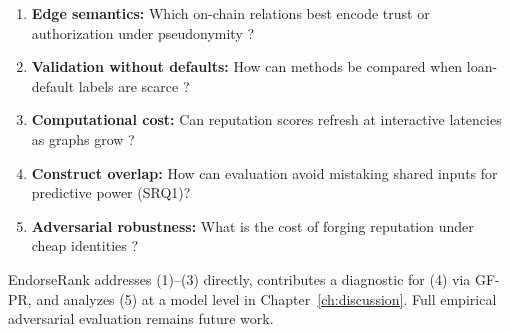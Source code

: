 \begin{enumerate}
\item \textbf{Edge semantics:} Which on-chain relations best encode trust or authorization under pseudonymity ?
\item \textbf{Validation without defaults:} How can methods be compared when loan-default labels are scarce ?
\item \textbf{Computational cost:} Can reputation scores refresh at interactive latencies as graphs grow ?
\item \textbf{Construct overlap:} How can evaluation avoid mistaking shared inputs for predictive power (SRQ1)?
\item \textbf{Adversarial robustness:} What is the cost of forging reputation under cheap identities ?
\end{enumerate}

EndorseRank addresses (1)--(3) directly, contributes a diagnostic for (4) via GF-PR, and analyzes (5) at a model level in Chapter~\ref{ch:discussion}. Full empirical adversarial evaluation remains future work.

